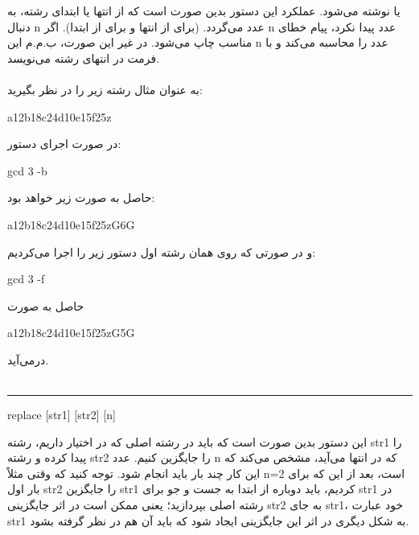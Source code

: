 \documentclass[]{article}
\begin{document}
یا
نوشته می‌شود. عملکرد این دستور بدین صورت است که از انتها یا ابتدای رشته، به دنبال n  عدد می‌گردد. (برای 
 از انتها و برای 
  از ابتدا). اگر n عدد پیدا نکرد، پیام خطای مناسب چاپ می‌شود. در غیر این صورت، ب.م.م این n عدد را محاسبه می‌کند و با فرمت
  در انتهای رشته می‌نویسد.\\\\
به عنوان مثال رشته زیر را در نظر بگیرید:
\begin{tcolorbox}[boxrule=0pt]
	\begin{latin}
  	  \large{
		a12b18c24d10e15f25z
		}
	\end{latin}
\end{tcolorbox}
در صورت اجرای دستور:
\begin{tcolorbox}[boxrule=0pt]
	\begin{latin}
  	  \large{
  	  	gcd 3 -b
		}
	\end{latin}
\end{tcolorbox}
حاصل به صورت زیر خواهد بود:
\begin{tcolorbox}[boxrule=0pt]
	\begin{latin}
  	  \large{
  	  	a12b18c24d10e15f25zG6G
		}
	\end{latin}
\end{tcolorbox}
و در صورتی که روی همان رشته اول دستور زیر را اجرا می‌کردیم:
\begin{tcolorbox}[boxrule=0pt]
	\begin{latin}
  	  \large{
  	  	gcd 3 -f
		}
	\end{latin}
\end{tcolorbox}
حاصل به صورت
\begin{tcolorbox}[boxrule=0pt]
	\begin{latin}
  	  \large{
  	  	a12b18c24d10e15f25zG5G
		}
	\end{latin}
\end{tcolorbox}
در‌می‌آید.\\\\
\noindent\rule[0.5ex]{\linewidth}{1pt}
\begin{tcolorbox}[boxrule=0pt]
	\begin{latin}
  	  \large{
  	  	replace [str1] [str2] [n]
		}
	\end{latin}
\end{tcolorbox}
این دستور بدین صورت است که باید در رشته اصلی که در اختیار داریم، رشته str1 را پیدا کرده و رشته str2 را جایگزین کنیم. عدد n که در انتها می‌آید، مشخص می‌کند که این کار چند بار باید انجام شود. توجه کنید که وقتی مثلاً n=2 است، بعد از این که برای بار اول str2 را جایگزین str1 کردیم، باید دوباره از ابتدا به جست و جو برای str1 در رشته اصلی بپردازید؛ یعنی ممکن است در اثر جایگزینی str2 به جای str1، خود عبارت str1 به شکل دیگری در اثر این جایگزینی ایجاد شود که باید آن هم در نظر گرفته بشود.\\\\
\end{document}
